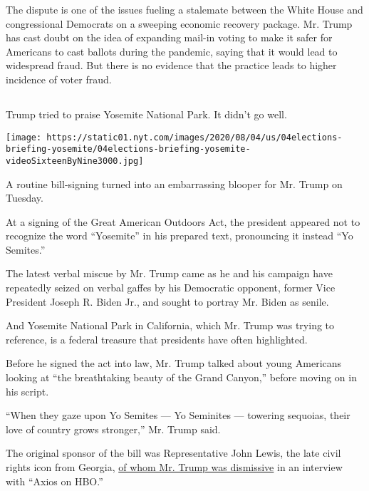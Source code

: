 The dispute is one of the issues fueling a stalemate between the White
House and congressional Democrats on a sweeping economic recovery
package. Mr. Trump has cast doubt on the idea of expanding mail-in
voting to make it safer for Americans to cast ballots during the
pandemic, saying that it would lead to widespread fraud. But there is no
evidence that the practice leads to higher incidence of voter fraud.

\hypertarget{-3}{%
\subsection{}\label{-3}}

Trump tried to praise Yosemite National Park. It didn't go well.

\texttt{[image: https://static01.nyt.com/images/2020/08/04/us/04elections-briefing-yosemite/04elections-briefing-yosemite-videoSixteenByNine3000.jpg]}

A routine bill-signing turned into an embarrassing blooper for Mr. Trump
on Tuesday.

At a signing of the Great American Outdoors Act, the president appeared
not to recognize the word ``Yosemite'' in his prepared text, pronouncing
it instead ``Yo Semites.''

The latest verbal miscue by Mr. Trump came as he and his campaign have
repeatedly seized on verbal gaffes by his Democratic opponent, former
Vice President Joseph R. Biden Jr., and sought to portray Mr. Biden as
senile.

And Yosemite National Park in California, which Mr. Trump was trying to
reference, is a federal treasure that presidents have often highlighted.

Before he signed the act into law, Mr. Trump talked about young
Americans looking at ``the breathtaking beauty of the Grand Canyon,''
before moving on in his script.

``When they gaze upon Yo Semites --- Yo Seminites --- towering sequoias,
their love of country grows stronger,'' Mr. Trump said.

The original sponsor of the bill was Representative John Lewis, the late
civil rights icon from Georgia,
\href{https://www.nytimes.com/2020/08/04/us/politics/trump-john-lewis-axios.html}{of
whom Mr. Trump was dismissive} in an interview with ``Axios on HBO.''

\hypertarget{-4}{%
\subsection{}\label{-4}}

